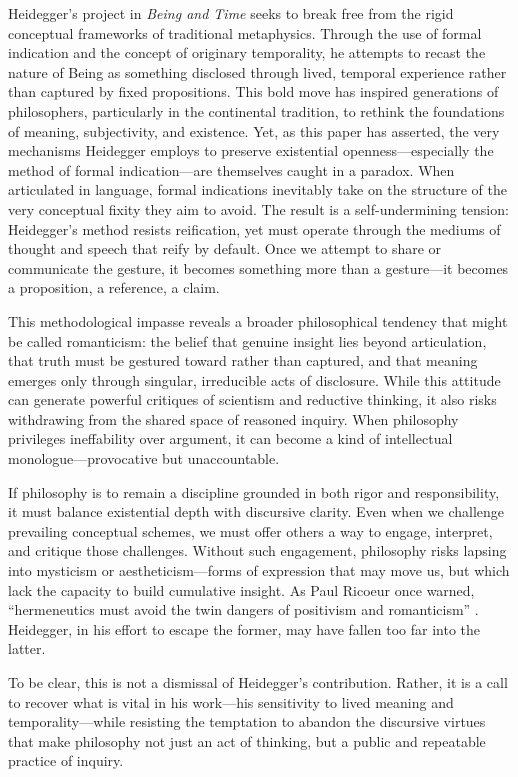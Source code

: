 \documentclass{article}
\begin{document}
Heidegger’s project in \textit{Being and Time} seeks to break free from the rigid conceptual frameworks of traditional metaphysics. Through the use of formal indication and the concept of originary temporality, he attempts to recast the nature of Being as something disclosed through lived, temporal experience rather than captured by fixed propositions. This bold move has inspired generations of philosophers, particularly in the continental tradition, to rethink the foundations of meaning, subjectivity, and existence.
\newpage
Yet, as this paper has asserted, the very mechanisms Heidegger employs to preserve existential openness—especially the method of formal indication—are themselves caught in a paradox. When articulated in language, formal indications inevitably take on the structure of the very conceptual fixity they aim to avoid. The result is a self-undermining tension: Heidegger’s method resists reification, yet must operate through the mediums of thought and speech that reify by default. Once we attempt to share or communicate the gesture, it becomes something more than a gesture—it becomes a proposition, a reference, a claim.

This methodological impasse reveals a broader philosophical tendency that might be called romanticism: the belief that genuine insight lies beyond articulation, that truth must be gestured toward rather than captured, and that meaning emerges only through singular, irreducible acts of disclosure. While this attitude can generate powerful critiques of scientism and reductive thinking, it also risks withdrawing from the shared space of reasoned inquiry. When philosophy privileges ineffability over argument, it can become a kind of intellectual monologue—provocative but unaccountable.

If philosophy is to remain a discipline grounded in both rigor and responsibility, it must balance existential depth with discursive clarity. Even when we challenge prevailing conceptual schemes, we must offer others a way to engage, interpret, and critique those challenges. Without such engagement, philosophy risks lapsing into mysticism or aestheticism—forms of expression that may move us, but which lack the capacity to build cumulative insight. As Paul Ricoeur once warned, “hermeneutics must avoid the twin dangers of positivism and romanticism” \parencite[p.~23]{ricoeur1976}. Heidegger, in his effort to escape the former, may have fallen too far into the latter.

To be clear, this is not a dismissal of Heidegger’s contribution. Rather, it is a call to recover what is vital in his work—his sensitivity to lived meaning and temporality—while resisting the temptation to abandon the discursive virtues that make philosophy not just an act of thinking, but a public and repeatable practice of inquiry.

\newpage
\printbibliography
\end{document}
